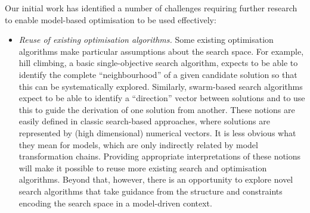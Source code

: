   Our initial work has identified a number of challenges requiring further research to enable model-based optimisation to be used effectively:
	\begin{itemize}
		\item \emph{Reuse of existing optimisation algorithms.} Some existing optimisation algorithms make particular assumptions about the search space. For example, hill climbing, a basic 
		      single-objective search algorithm, expects to be able to identify the complete ``neighbourhood'' of a given candidate solution so that this can be systematically explored. Similarly, 
					swarm-based search algorithms expect to be able to identify a ``direction'' vector between solutions and to use this to guide the derivation of one solution from another. These notions are
					easily defined in classic search-based approaches, where solutions are represented by (high dimensional) numerical vectors. It is less obvious what they mean for models, which are only
					indirectly related by model transformation chains. Providing appropriate interpretations of these notions will make it possible to reuse more existing search and optimisation algorithms.
					Beyond that, however, there is an opportunity to explore novel search algorithms that take guidance from the structure and constraints encoding the search space in a model-driven context.


\end{itemize}
